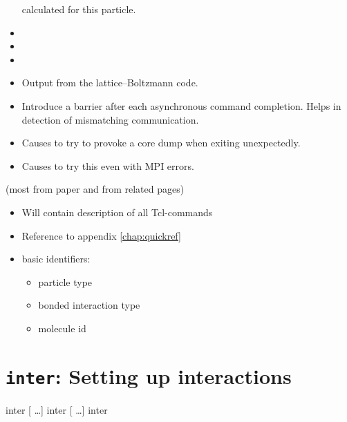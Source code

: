 \begin{itemize}
  calculated for this particle.
\item {}
\item {}
\item {}
\item {} Output from the lattice--Boltzmann code.
\item {} Introduce a barrier after each asynchronous command
  completion. Helps in detection of mismatching communication.
\item {} Causes \es{} to try to provoke a core dump when exiting
  unexpectedly.
\item {} Causes \es{} to try this even with MPI errors.
\end{itemize}




(most from paper and from related pages)

\begin{itemize}
\item Will contain description of all Tcl-commands
\item Reference to appendix \vref{chap:quickref}
\item basic identifiers:
  \begin{itemize}
  \item particle type
  \item bonded interaction type
  \item molecule id
  \end{itemize}
\end{itemize}


\section{\texttt{inter}: Setting up interactions}
\label{sec:inter}
\begin{syntax}
  {inter 
    [ \ldots ]
  }
  {inter 
      [
    \ldots ]
  }
  {inter}
\end{syntax}



